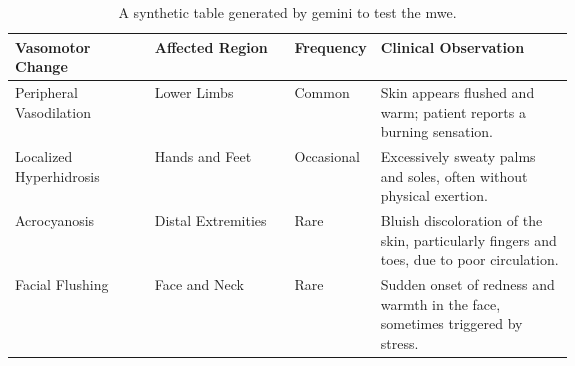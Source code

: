 \begin{table}[h!]
    \centering
    \begin{tabularx}{\linewidth}{p{0.25\linewidth}p{0.25\linewidth}p{0.15\linewidth}X}
        \toprule
        \textbf{Vasomotor Change} & \textbf{Affected Region} & \textbf{Frequency} & \textbf{Clinical Observation} \\
        \midrule
        Peripheral Vasodilation & Lower Limbs & Common & Skin appears flushed and warm; patient reports a burning sensation. \\
        Localized Hyperhidrosis & Hands and Feet & Occasional & Excessively sweaty palms and soles, often without physical exertion. \\
        Acrocyanosis & Distal Extremities & Rare & Bluish discoloration of the skin, particularly fingers and toes, due to poor circulation. \\
        Facial Flushing & Face and Neck & Rare & Sudden onset of redness and warmth in the face, sometimes triggered by stress. \\
        \bottomrule
    \end{tabularx}
    \caption[Synthetic Data]{A synthetic table generated by gemini to test the mwe. \blindtext}
    \label{tab:vasomotor_changes1}
\end{table}